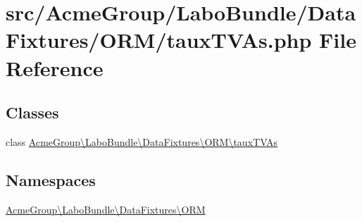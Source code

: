\hypertarget{taux_t_v_as_8php}{\section{src/\+Acme\+Group/\+Labo\+Bundle/\+Data\+Fixtures/\+O\+R\+M/taux\+T\+V\+As.php File Reference}
\label{taux_t_v_as_8php}
}
\subsection*{Classes}
\begin{DoxyCompactItemize}
\item 
class \hyperlink{class_acme_group_1_1_labo_bundle_1_1_data_fixtures_1_1_o_r_m_1_1taux_t_v_as}{Acme\+Group\textbackslash{}\+Labo\+Bundle\textbackslash{}\+Data\+Fixtures\textbackslash{}\+O\+R\+M\textbackslash{}taux\+T\+V\+As}
\end{DoxyCompactItemize}
\subsection*{Namespaces}
\begin{DoxyCompactItemize}
\item 
 \hyperlink{namespace_acme_group_1_1_labo_bundle_1_1_data_fixtures_1_1_o_r_m}{Acme\+Group\textbackslash{}\+Labo\+Bundle\textbackslash{}\+Data\+Fixtures\textbackslash{}\+O\+R\+M}
\end{DoxyCompactItemize}

